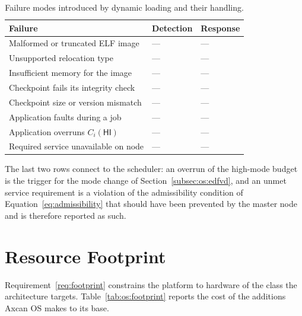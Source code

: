 \begin{table}[t]
  \centering
  \caption{Failure modes introduced by dynamic loading and their handling.}
  \label{tab:os:failures}
  \small
  \begin{tabular}{@{}p{}p{}p{}@{}}
    \toprule
    Failure & Detection & Response \\
    \midrule
    Malformed or truncated ELF image      & --- & --- \\
    Unsupported relocation type           & --- & --- \\
    Insufficient memory for the image     & --- & --- \\
    Checkpoint fails its integrity check  & --- & --- \\
    Checkpoint size or version mismatch   & --- & --- \\
    Application faults during a job       & --- & --- \\
    Application overruns $C_i(\textsf{HI})$ & --- & --- \\
    Required service unavailable on node  & --- & --- \\
    \bottomrule
  \end{tabular}
\end{table}

The last two rows connect to the scheduler: an overrun of the high-mode budget
is the trigger for the mode change of Section~\ref{subsec:os:edfvd}, and an
unmet service requirement is a violation of the admissibility condition of
Equation~\ref{eq:admissibility} that should have been prevented by the
master node and is therefore reported as such.

\section{Resource Footprint}\label{sec:os:footprint}

Requirement~\ref{req:footprint} constrains the platform to hardware of the
class the architecture targets. Table~\ref{tab:os:footprint} reports the cost
of the additions Axcan OS makes to its base.

